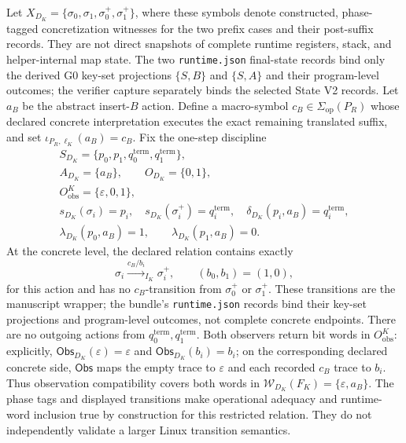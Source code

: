 \documentclass[conference]{IEEEtran}
\begin{document}
Let $X_{D_K}=\{\sigma_0,\sigma_1,\sigma_0^+,\sigma_1^+\}$, where these symbols denote constructed, phase-tagged concretization witnesses for the two prefix cases and their post-suffix records. They are not direct snapshots of complete runtime registers, stack, and helper-internal map state. The two \texttt{runtime.json} final-state records bind only the derived G0 key-set projections $\{S,B\}$ and $\{S,A\}$ and their program-level outcomes; the verifier capture separately binds the selected State V2 records. Let $a_B$ be the abstract insert-$B$ action. Define a macro-symbol $c_B\in\Sigma_{\mathrm{op}}(P_R)$ whose declared concrete interpretation executes the exact remaining translated suffix, and set $\iota_{P_R,\ell_K}(a_B)=c_B$. Fix the one-step discipline
\begin{equation}
\begin{gathered}
S_{D_K}=\{p_0,p_1,q^{\mathrm{term}}_0,q^{\mathrm{term}}_1\},\\
A_{D_K}=\{a_B\},\qquad O_{D_K}=\{0,1\},\\
O^K_{\mathrm{obs}}=\{\varepsilon,0,1\},\\
s_{D_K}(\sigma_i)=p_i,\quad s_{D_K}(\sigma_i^+)=q^{\mathrm{term}}_i,\quad
\delta_{D_K}(p_i,a_B)=q^{\mathrm{term}}_i,\\
\lambda_{D_K}(p_0,a_B)=1,\qquad
\lambda_{D_K}(p_1,a_B)=0.
\end{gathered}
\end{equation}
At the concrete level, the declared relation contains exactly
\begin{equation}
\sigma_i\mathrel{\overset{c_B/b_i}{\longrightarrow}_{I_K}}\sigma_i^+,
\qquad (b_0,b_1)=(1,0),
\end{equation}
for this action and has no $c_B$-transition from $\sigma_0^+$ or $\sigma_1^+$. These transitions are the manuscript wrapper; the bundle's \texttt{runtime.json} records bind their key-set projections and program-level outcomes, not complete concrete endpoints. There are no outgoing actions from $q^{\mathrm{term}}_0,q^{\mathrm{term}}_1$. Both observers return bit words in $O^K_{\mathrm{obs}}$: explicitly, $\mathsf{Obs}_{D_K}(\varepsilon)=\varepsilon$ and $\mathsf{Obs}_{D_K}(b_i)=b_i$; on the corresponding declared concrete side, $\mathsf{Obs}$ maps the empty trace to $\varepsilon$ and each recorded $c_B$ trace to $b_i$. Thus observation compatibility covers both words in $\mathcal W_{D_K}(F_K)=\{\varepsilon,a_B\}$. The phase tags and displayed transitions make operational adequacy and runtime-word inclusion true by construction for this restricted relation. They do not independently validate a larger Linux transition semantics.
\end{document}
